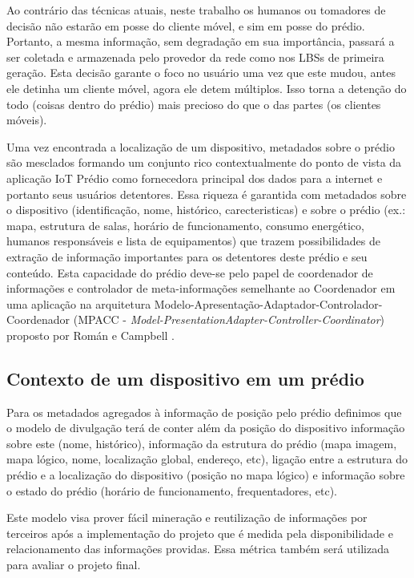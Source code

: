 Ao contrário das técnicas atuais, neste trabalho os humanos ou tomadores de
decisão não estarão em posse do cliente móvel, e sim em posse do prédio.
Portanto, a mesma informação, sem degradação em sua importância, passará a ser
coletada e armazenada pelo provedor da rede como nos LBSs de primeira geração.
Esta decisão garante o foco no usuário uma vez que este mudou, antes ele detinha
um cliente móvel, agora ele detem múltiplos. Isso torna a detenção do todo
(coisas dentro do prédio) mais precioso do que o das partes (os clientes
móveis).

Uma vez encontrada a localização de um dispositivo, metadados sobre o prédio são
mesclados formando um conjunto rico contextualmente do ponto de vista da
aplicação IoT Prédio como fornecedora principal dos dados para a internet e
portanto seus usuários detentores. Essa riqueza é garantida com metadados sobre
o dispositivo (identificação, nome, histórico, carecteristicas) e sobre o prédio
(ex.: mapa, estrutura de salas, horário de funcionamento, consumo energético,
humanos responsáveis e lista de equipamentos) que trazem possibilidades de
extração de informação importantes para os detentores deste prédio e seu
conteúdo. Esta capacidade do prédio deve-se pelo papel de coordenador de
informações e controlador de meta-informações semelhante ao Coordenador em uma
aplicação na arquitetura Modelo-Apresentação-Adaptador-Controlador-Coordenador
(MPACC - \textit{Model-PresentationAdapter-Controller-Coordinator}) proposto por
Román e Campbell .


\subsection{Contexto de um dispositivo em um prédio}
\label{subsec:Contexto de um dispositivo em um prédio}

Para os metadados agregados à informação de posição pelo prédio definimos que o
modelo de divulgação terá de conter além da posição do dispositivo informação
sobre este (nome, histórico), informação da estrutura do prédio (mapa imagem,
mapa lógico, nome, localização global, endereço, etc), ligação entre a estrutura
do prédio e a localização do dispositivo (posição no mapa lógico) e informação
sobre o estado do prédio (horário de funcionamento, frequentadores, etc).


Este modelo visa prover fácil mineração e reutilização de informações por
terceiros após a implementação do projeto que é medida pela disponibilidade e
relacionamento das informações providas. Essa métrica também será utilizada para
avaliar o projeto final.


